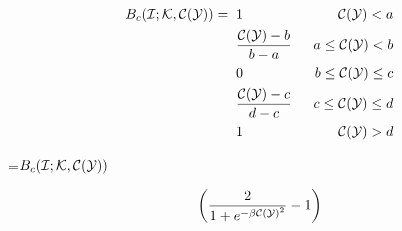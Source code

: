 {\newpage
\clearpage
\samepage \begin{eqnarray}B_c({\cal I}
 ;{\cal{K}}
 ,{\cal{C(Y)}}
 ) =& \;\;  1      &\;\; {\cal{C(Y)}}
  < a    \nonumber
  \\ 
     & \;\;  \frac{{\cal{C(Y)}}
 -b}{b-a}& \;\; a \le {\cal{C(Y)}}
  < b \nonumber
   \\ 
     & \;\;  0      &  \;\; b \le {\cal{C(Y)}}
 \le c \nonumber
   \\ 
     & \;\;  \frac{{\cal{C(Y)}}
 -c}{d-c}&  \;\; c \le {\cal{C(Y)}}
  \le d \nonumber
  \\ 
     & \; \;  1      &  \;\; {\cal{C(Y)}}
  >d  
     \label{eq:basis}
\end{eqnarray}
}

{\newpage
\clearpage
\samepage \setbox\sizebox=\hbox{$B_c({\cal I}
 ;{\cal{K}}
 ,{\cal{C(Y)}}
 )$}\box\sizebox
}

{\newpage
\clearpage
\samepage \begin{equation}\left ( \frac{2}{1+e^{-\beta {\cal{C(Y)}}^2}}-1 \right ) \end{equation}
}

